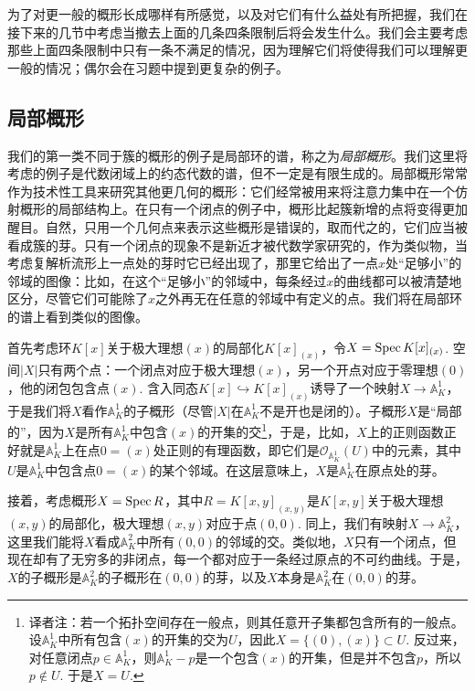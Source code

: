 为了对更一般的概形长成哪样有所感觉，以及对它们有什么益处有所把握，我们在接下来的几节中考虑当撤去上面的几条四条限制后将会发生什么。我们会主要考虑那些上面四条限制中只有一条不满足的情况，因为理解它们将使得我们可以理解更一般的情况；偶尔会在习题中提到更复杂的例子。

\subsection{局部概形}

我们的第一类不同于簇的概形的例子是局部环的谱，称之为\textit{局部概形}。我们这里将考虑的例子是代数闭域上的约态代数的谱，但不一定是有限生成的。局部概形常常作为技术性工具来研究其他更几何的概形：它们经常被用来将注意力集中在一个仿射概形的局部结构上。在只有一个闭点的例子中，概形比起簇新增的点将变得更加醒目。自然，只用一个几何点来表示这些概形是错误的，取而代之的，它们应当被看成簇的芽。只有一个闭点的现象不是新近才被代数学家研究的，作为类似物，当考虑复解析流形上一点处的芽时它已经出现了，那里它给出了一点$x$处“足够小”的邻域的图像：比如，在这个“足够小”的邻域中，每条经过$x$的曲线都可以被清楚地区分，尽管它们可能除了$x$之外再无在任意的邻域中有定义的点。我们将在局部环的谱上看到类似的图像。

首先考虑环$K[x]$关于极大理想$(x)$的局部化$K[x]_{(x)}$，令$X=\operatorname{Spec} K[x]_{(x)}$. 空间$|X|$只有两个点：一个闭点对应于极大理想$(x)$，另一个开点对应于零理想$(0)$，他的闭包包含点$(x)$. 含入同态$K[x]\hookrightarrow K[x]_{(x)}$诱导了一个映射$X\to \mathbb{A}_K^1$，于是我们将$X$看作$\mathbb{A}_K^1$的子概形（尽管$|X|$在$\mathbb{A}_K^1$不是开也是闭的）。子概形$X$是“局部的”，因为$X$是所有$\mathbb{A}_K^1$中包含$(x)$的开集的交\footnote{译者注：若一个拓扑空间存在一般点，则其任意开子集都包含所有的一般点。设$\mathbb{A}_K^1$中所有包含$(x)$的开集的交为$U$，因此$X=\{(0),(x)\}\subset U$. 反过来，对任意闭点$p\in \mathbb{A}_K^1$，则$\mathbb{A}_K^1-p$是一个包含$(x)$的开集，但是并不包含$p$，所以$p\not\in U$. 于是$X=U$.}，于是，比如，$X$上的正则函数正好就是$\mathbb{A}_K^1$上在点$0=(x)$处正则的有理函数，即它们是$\mathscr{O}_{\mathbb{A}_K^1}(U)$中的元素，其中$U$是$\mathbb{A}_K^1$中包含点$0=(x)$的某个邻域。在这层意味上，$X$是$\mathbb{A}_K^1$在原点处的芽。

接着，考虑概形$X=\operatorname{Spec} R$，其中$R=K[x,y]_{(x,y)}$是$K[x,y]$关于极大理想$(x,y)$的局部化，极大理想$(x,y)$对应于点$(0,0)$. 同上，我们有映射$X\to \mathbb{A}_K^2$，这里我们能将$X$看成$\mathbb{A}_K^2$中所有$(0,0)$的邻域的交。类似地，$X$只有一个闭点，但现在却有了无穷多的非闭点，每一个都对应于一条经过原点的不可约曲线。于是，$X$的子概形是$\mathbb{A}_K^2$的子概形在$(0,0)$的芽，以及$X$本身是$\mathbb{A}_K^2$在$(0,0)$的芽。

